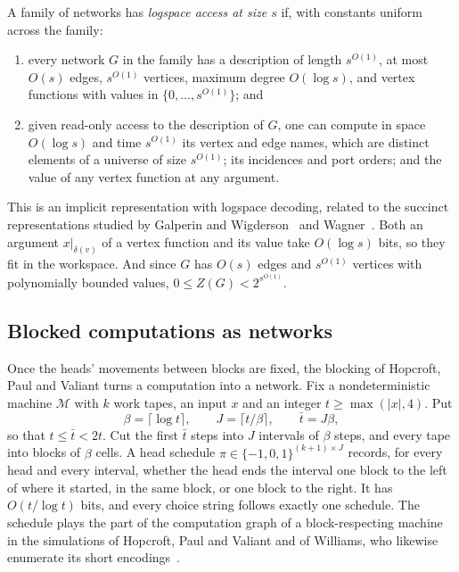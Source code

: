 \documentclass[11pt]{article}
\theoremstyle{definition}
\theoremstyle{definition}
\theoremstyle{remark}
\begin{document}
\begin{definition}\label{def:access}
A family of networks has \emph{logspace access at size $s$} if, with constants uniform across the family:
\begin{enumerate}[label=(\alph*)]
\item every network $G$ in the family has a description of length $s^{O(1)}$, at most $O(s)$ edges, $s^{O(1)}$ vertices, maximum degree $O(\log s)$, and vertex functions with values in $\{0,\dots,s^{O(1)}\}$; and
\item given read-only access to the description of $G$, one can compute in space $O(\log s)$ and time $s^{O(1)}$ its vertex and edge names, which are distinct elements of a universe of size $s^{O(1)}$; its incidences and port orders; and the value of any vertex function at any argument.
\end{enumerate}
\end{definition}

This is an implicit representation with logspace decoding, related to the succinct representations studied by Galperin and Wigderson~\cite{GW83} and Wagner~\cite{Wag86}. Both an argument $x|_{\delta(v)}$ of a vertex function and its value take $O(\log s)$ bits, so they fit in the workspace. And since $G$ has $O(s)$ edges and $s^{O(1)}$ vertices with polynomially bounded values, $0\le Z(G)<2^{s^{O(1)}}$.

\subsection{Blocked computations as networks}

Once the heads' movements between blocks are fixed, the blocking of Hopcroft, Paul and Valiant turns a computation into a network. Fix a nondeterministic machine $\mathcal M$ with $k$ work tapes, an input $x$ and an integer $t\ge\max(|x|,4)$. Put
\[
\beta=\lceil\log t\rceil,\qquad J=\lceil t/\beta\rceil,\qquad\bar t=J\beta,
\]
so that $t\le\bar t<2t$. Cut the first $\bar t$ steps into $J$ intervals of $\beta$ steps, and every tape into blocks of $\beta$ cells. A head schedule $\pi\in\{-1,0,1\}^{(k+1)\times J}$ records, for every head and every interval, whether the head ends the interval one block to the left of where it started, in the same block, or one block to the right. It has $O(t/\log t)$ bits, and every choice string follows exactly one schedule. The schedule plays the part of the computation graph of a block-respecting machine in the simulations of Hopcroft, Paul and Valiant and of Williams, who likewise enumerate its short encodings~\cite{HPV77,Wil25}.
\end{document}
